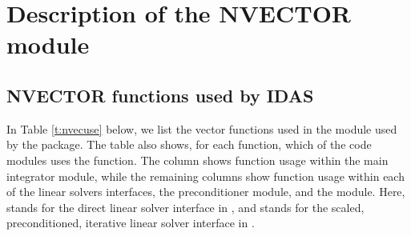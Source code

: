 \chapter{Description of the NVECTOR module}\label{s:nvector}



\section{NVECTOR functions used by IDAS}

In Table \ref{t:nvecuse} below, we list the vector functions used in the 
{\nvector} module used by the {\idas} package.
The table also shows, for each function, which of the code modules uses
the function. The {\idas} column shows function usage within the main
integrator module, while the remaining columns show function usage
within each of the {\idas} linear solvers interfaces, the {\idabbdpre}
preconditioner module, and the {\idaa} module.  Here,
{\idadls} stands for the direct linear solver interface in {\idas}, and
{\idaspils} stands for the scaled, preconditioned, iterative linear
solver interface in {\idas}.

